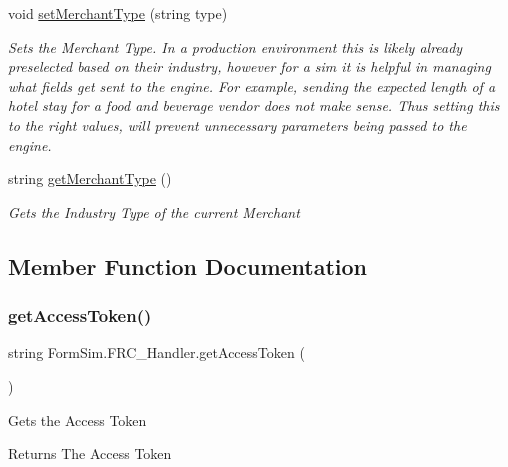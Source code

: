 \begin{DoxyCompactItemize}
void \mbox{\hyperlink{interface_form_sim_1_1_f_r_c___handler_a23a2917fb9455954723cd3982b31b76c}{set\+Merchant\+Type}} (string type)
\begin{DoxyCompactList}\small\item\em Sets the Merchant Type. In a production environment this is likely already preselected based on their industry, however for a sim it is helpful in managing what fields get sent to the engine. For example, sending the expected length of a hotel stay for a food and beverage vendor does not make sense. Thus setting this to the right values, will prevent unnecessary parameters being passed to the engine. \end{DoxyCompactList}\item 
string \mbox{\hyperlink{interface_form_sim_1_1_f_r_c___handler_ad7484e0f6199cfae3beb33d91d6f1368}{get\+Merchant\+Type}} ()
\begin{DoxyCompactList}\small\item\em Gets the Industry Type of the current Merchant \end{DoxyCompactList}\end{DoxyCompactItemize}


\subsection{Member Function Documentation}
\mbox{\label{interface_form_sim_1_1_f_r_c___handler_ad24521be35d127e83221c3c7ecf6fbf8}} 
\subsubsection{\texorpdfstring{get\+Access\+Token()}{getAccessToken()}}
{\footnotesize\ttfamily string Form\+Sim.\+F\+R\+C\+\_\+\+Handler.\+get\+Access\+Token (\begin{DoxyParamCaption}{ }\end{DoxyParamCaption})}



Gets the Access Token 

\begin{DoxyReturn}{Returns}
The Access Token
\end{DoxyReturn}


